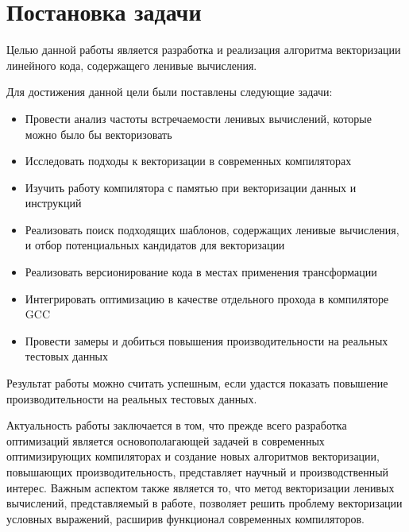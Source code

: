\section{Постановка задачи}
\label{sec:Chapter1} 


Целью данной работы является разработка и реализация алгоритма векторизации линейного кода, содержащего ленивые вычисления.

Для достижения данной цели были поставлены следующие задачи:

\begin{itemize}
    \item Провести анализ частоты встречаемости ленивых вычислений, которые можно было бы векторизовать
    \item Исследовать подходы к векторизации в современных компиляторах
    \item Изучить работу компилятора с памятью при векторизации данных и инструкций
    \item Реализовать поиск подходящих шаблонов, содержащих ленивые вычисления, и отбор потенциальных кандидатов для векторизации
    \item Реализовать версионирование кода в местах применения трансформации
    \item Интегрировать оптимизацию в качестве отдельного прохода в компиляторе GCC
    \item Провести замеры и добиться повышения производительности на реальных тестовых данных
\end{itemize}

Результат работы можно считать успешным, если удастся показать повышение производительности на реальных тестовых данных. 

Актуальность работы заключается в том, что прежде всего разработка оптимизаций является основополагающей задачей в современных оптимизирующих компиляторах и создание новых алгоритмов векторизации, повышающих производительность, представляет научный и производственный интерес. Важным аспектом также является то, что метод векторизации ленивых вычислений, представляемый в работе, позволяет решить проблему векторизации условных выражений, расширив функционал современных компиляторов.
\newpage
